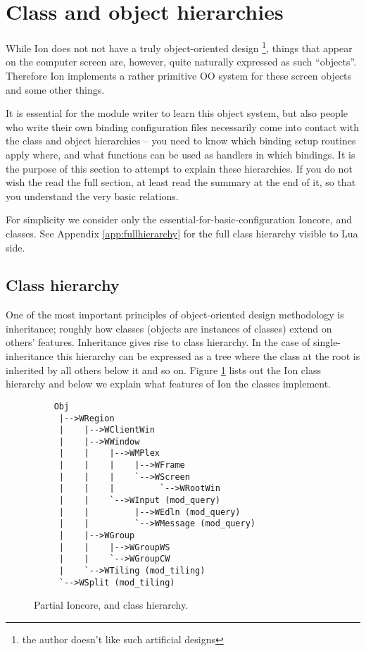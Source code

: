 
\section{Class and object hierarchies}
\label{sec:objects}

While Ion does not not have a truly object-oriented design
\footnote{the author doesn't like such artificial designs},
things that appear on the computer screen are, however, quite
naturally expressed as such ``objects''. Therefore Ion implements
a rather primitive OO system for these screen objects and some
other things. 

It is essential for the module writer to learn this object
system, but also people who write their own binding configuration files
necessarily come into contact with the class and object hierarchies
-- you need to know which binding setup routines apply where, 
and what functions can be used as handlers in which bindings.
It is the purpose of this section to attempt to explain these 
hierarchies. If you do not wish the read the full section, at least
read the summary at the end of it, so that you understand the very
basic relations.

For simplicity we consider only the essential-for-basic-configuration
Ioncore,  and  classes. 
See Appendix \ref{app:fullhierarchy} for the full class hierarchy visible
to Lua side.

\subsection{Class hierarchy}

One of the most important principles of object-oriented design methodology
is inheritance; roughly how classes (objects are instances of classes)
extend on others' features. Inheritance gives rise to class hierarchy.
In the case of single-inheritance this hierarchy can be expressed as a
tree where the class at the root is inherited by all others below it
and so on. Figure \ref{fig:classhierarchy} lists out the Ion class 
hierarchy and below we explain what features of Ion the classes 
implement.

\begin{figure}
\begin{htmlonly}
\docode %
\end{htmlonly}
\begin{verbatim}
    Obj
     |-->WRegion
     |    |-->WClientWin
     |    |-->WWindow
     |    |    |-->WMPlex
     |    |    |    |-->WFrame
     |    |    |    `-->WScreen
     |    |    |         `-->WRootWin
     |    |    `-->WInput (mod_query)
     |    |         |-->WEdln (mod_query)
     |    |         `-->WMessage (mod_query)
     |    |-->WGroup
     |    |    |-->WGroupWS
     |    |    `-->WGroupCW
     |    `-->WTiling (mod_tiling)
     `-->WSplit (mod_tiling)
\end{verbatim}
\caption{Partial Ioncore,  and  
    class hierarchy.}
\label{fig:classhierarchy}
\end{figure}

